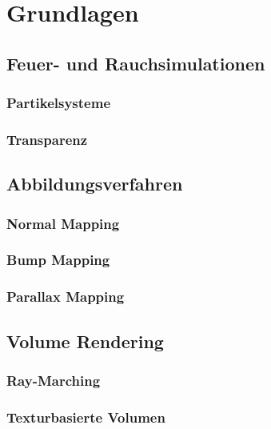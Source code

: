 \section{Grundlagen}


\subsection{Feuer- und Rauchsimulationen}
\subsubsection{Partikelsysteme}
\subsubsection{Transparenz}
\subsection{Abbildungsverfahren}
\subsubsection{Normal Mapping}
\subsubsection{Bump Mapping}
\subsubsection{Parallax Mapping}
\subsection{Volume Rendering}
\subsubsection{Ray-Marching}
\subsubsection{Texturbasierte Volumen}


\newpage
